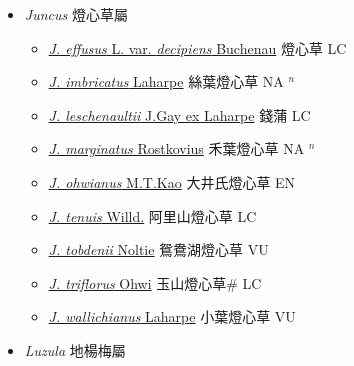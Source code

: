 
  \begin{itemize}
 \item[] \textit{Juncus} 燈心草屬
                    
  \begin{itemize}
        \item[] \href{http://www.theplantlist.org/tpl1.1/search?q=Juncus+effusus+var.+decipiens}{\textit{J. effusus} L. var. \textit{decipiens} Buchenau}   燈心草 LC
        \item[] \href{http://www.theplantlist.org/tpl1.1/search?q=Juncus+imbricatus}{\textit{J. imbricatus} Laharpe}   絲葉燈心草 NA $^n$
        \item[] \href{http://www.theplantlist.org/tpl1.1/search?q=Juncus+leschenaultii}{\textit{J. leschenaultii} J.Gay ex Laharpe}   錢蒲 LC
        \item[] \href{http://www.theplantlist.org/tpl1.1/search?q=Juncus+marginatus}{\textit{J. marginatus} Rostkovius}   禾葉燈心草 NA $^n$
        \item[] \href{http://www.theplantlist.org/tpl1.1/search?q=Juncus+ohwianus}{\textit{J. ohwianus} M.T.Kao}   大井氏燈心草 EN
        \item[] \href{http://www.theplantlist.org/tpl1.1/search?q=Juncus+tenuis}{\textit{J. tenuis} Willd.}   阿里山燈心草 LC
        \item[] \href{http://www.theplantlist.org/tpl1.1/search?q=Juncus+tobdenii}{\textit{J. tobdenii} Noltie}   鴛鴦湖燈心草 VU
        \item[] \href{http://www.theplantlist.org/tpl1.1/search?q=Juncus+triflorus}{\textit{J. triflorus} Ohwi}   玉山燈心草\# LC
        \item[] \href{http://www.theplantlist.org/tpl1.1/search?q=Juncus+wallichianus}{\textit{J. wallichianus} Laharpe}   小葉燈心草 VU
  \end{itemize}
 \item[] \textit{Luzula} 地楊梅屬
                    

\end{itemize}
